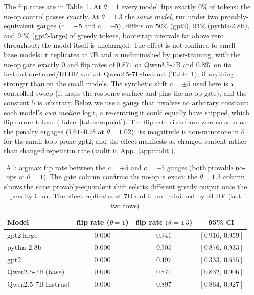 \documentclass[11pt]{article}
\newcommand{\thp}{\theta}
\begin{document}
The flip rates are in Table~\ref{tab:a1}. At $\thp=1$ every model flips exactly
$0\%$ of tokens: the no-op control passes exactly. At $\thp=1.3$ the \emph{same model}, run under two
provably-equivalent gauges ($c=+5$ and $c=-5$), differs on $50\%$ (gpt2), $91\%$
(pythia-2.8b), and $94\%$ (gpt2-large) of greedy tokens, bootstrap intervals far above zero
throughout; the model itself is unchanged. The effect is not confined to small base models: it replicates at 7B and is
undiminished by post-training, with the no-op gate exactly $0$ and flip rates of $0.871$ on
Qwen2.5-7B and $0.897$ on its instruction-tuned/RLHF variant Qwen2.5-7B-Instruct
(Table~\ref{tab:a1}), if anything stronger than on the small models. The synthetic shift
$c=\pm5$ used here is a controlled sweep (it maps the response surface and pins the no-op
gate), and the constant $5$ is arbitrary. Below we use a gauge that involves no
arbitrary constant: each model's \emph{own median} logit, a re-centring it could equally
have shipped, which flips more tokens (Table~\ref{tab:zeropoint}). The flip rate
rises from zero as soon as the penalty engages ($0.61$--$0.78$ at $\thp=1.02$); its
magnitude is non-monotone in $\thp$ for the small loop-prone gpt2, and the effect manifests as
changed content rather than changed repetition rate (audit in App.~\ref{app:audit}).

\begin{table}[t]
\centering
\caption{A1: argmax flip rate between the $c=+5$ and $c=-5$ gauges (both provable no-ops at
$\thp=1$). The gate column confirms the no-op is exact; the $\thp=1.3$ column shows
the same provably-equivalent shift selects different greedy output once the penalty is on.
The effect replicates at 7B and is undiminished by RLHF (last two rows).}
\label{tab:a1}
\begin{tabular}{lccc}
\toprule
Model & flip rate ($\thp{=}1$) & flip rate ($\thp{=}1.3$) & 95\% CI \\
\midrule
gpt2-large            & $0.000$ & $0.941$ & $[0.916,\,0.959]$ \\
pythia-2.8b           & $0.000$ & $0.905$ & $[0.876,\,0.933]$ \\
gpt2                  & $0.000$ & $0.497$ & $[0.333,\,0.655]$ \\
\midrule
Qwen2.5-7B (base)     & $0.000$ & $0.871$ & $[0.832,\,0.906]$ \\
Qwen2.5-7B-Instruct   & $0.000$ & $0.897$ & $[0.864,\,0.927]$ \\
\bottomrule
\end{tabular}
\end{table}
\end{document}
